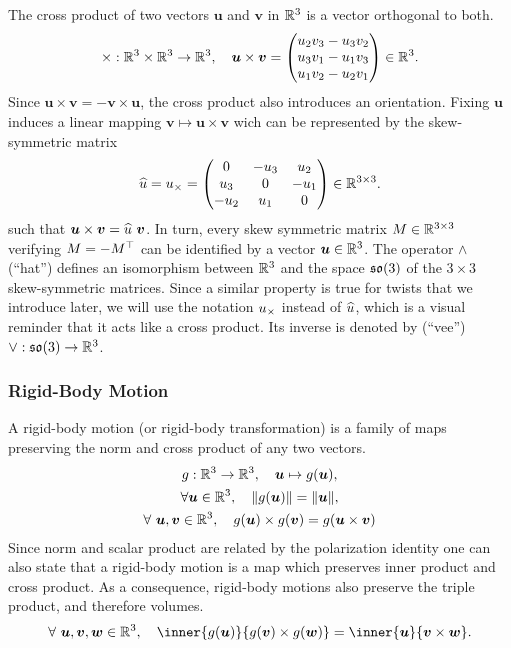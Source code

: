 The cross product of two vectors $\bm{u}$ and $\bm{v}$ in $\R^3$ is a vector orthogonal to both.
\[
	\times : \R^3 \times \R^3 \rightarrow \R^3,\quad \bm{u} \times \bm{v} =
	\begin{pmatrix}
		u_2v_3 - u_3v_2 \\
		u_3v_1 - u_1v_3 \\
		u_1v_2 - u_2v_1
	\end{pmatrix} \in \R^3.
\]
Since $\bm{u} \times \bm{v} = -\bm{v} \times \bm{u}$, the cross product
also introduces an orientation.
Fixing $\bm{u}$ induces a linear mapping $\bm{v} \mapsto \bm{u} \times \bm{v}$
wich can be represented by the skew-symmetric matrix
\[
	\twist{u} = \cross{u} = \hatmat{u_1}{u_2}{u_3} \in \RR{3}{3}.
\]
such that $\bm{u} \times \bm{v} = \twist{u} \ \bm{v}$.
In turn, every skew symmetric matrix $M \in \RR{3}{3}$
verifying $M = -\tr{M}$
can be identified by a vector $\bm{u} \in \R^3$.
The operator $\wedge$ (``hat'') defines an isomorphism between $\R^3$
and the space $\sooo$ of the $3 \times 3$ skew-symmetric matrices.
Since a similar property is true for twists that we introduce later,
we will use the notation $\cross{u}$ instead of $\twist{u}$,
which is a visual reminder that it acts like a cross product.
Its inverse is denoted by (``vee'') $\vee : \sooo \rightarrow \R^3$.


\subsubsection{Rigid-Body Motion}%
\label{ssub:rigid_body_motion}

A rigid-body motion (or rigid-body transformation)
is a family of maps preserving the norm and cross product of any two vectors.
\begin{gather*}
	g : \R^3 \rightarrow \R^3,\quad \bm{u} \mapsto g(\bm{u}), \\
	\forall \bm{u} \in \R^3, \quad \|g(\bm{u})\| = \|\bm{u}\|, \\
	\forall\ \bm{u},\bm{v} \in \R^3, \quad g(\bm{u}) \times g(\bm{v}) =
		g(\bm{u} \times \bm{v})
\end{gather*}
Since norm and scalar product are related by the polarization identity
one can also state that a rigid-body motion is a map which
preserves inner product and cross product.
As a consequence, rigid-body motions also preserve the triple product,
and therefore volumes.
\[
	\forall\ \bm{u}, \bm{v}, \bm{w} \in \R^3, \quad
	\inner{g(\bm{u})}{g(\bm{v}) \times g(\bm{w})} =
		\inner{\bm{u}}{\bm{v} \times \bm{w}}.
\]

